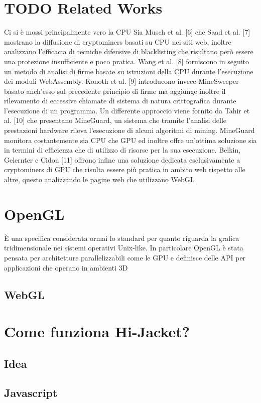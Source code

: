 \documentclass[11pt]{article}
\begin{document}
\section{{\bfseries\sffamily TODO} Related Works}
\label{sec:org7d2808a}
Ci si è mossi principalmente vero la CPU
Sia Musch et al. [6] che Saad et al. [7] mostrano la diffusione di cryptominers basati su CPU nei siti web, inoltre analizzano l’efficacia di tecniche difensive di blacklisting che risultano però essere una protezione insufficiente e poco pratica. Wang et al. [8] forniscono in seguito un metodo di analisi di firme basate su istruzioni della CPU durante l’esecuzione dei moduli WebAssembly. Konoth et al. [9] introducono invece MineSweeper basato anch’esso sul precedente principio di firme ma aggiunge inoltre il rilevamento di eccessive chiamate di sistema di natura crittografica durante l’esecuzione di un programma. Un differente approccio viene fornito da Tahir et al. [10] che presentano MineGuard, un sistema che tramite l’analisi delle prestazioni hardware rileva l’esecuzione di alcuni algoritmi di mining. MineGuard monitora costantemente sia CPU che GPU ed inoltre offre un’ottima soluzione sia in termini di efficienza che di utilizzo di risorse per la sua esecuzione. Belkin, Gelernter e Cidon [11] offrono infine una soluzione dedicata esclusivamente a cryptominers di GPU che risulta essere più pratica in ambito web rispetto alle altre, questo analizzando le pagine web che utilizzano WebGL
\section{OpenGL}
\label{sec:org00c2f0c}
È una specifica considerata ormai lo standard per quanto riguarda la grafica tridimensionale nei
sistemi operativi Unix-like. In particolare OpenGL è stata pensata per architetture parallelizzabili
come le GPU e definisce delle API per applicazioni che operano in ambienti 3D
\subsection{WebGL}
\label{sec:org58f529d}
\section{Come funziona Hi-Jacket?}
\label{sec:orgfd9cb03}
\subsection{Idea}
\label{sec:org6a56314}
\subsection{Javascript}
\label{sec:orgc529a7f}
\end{document}
